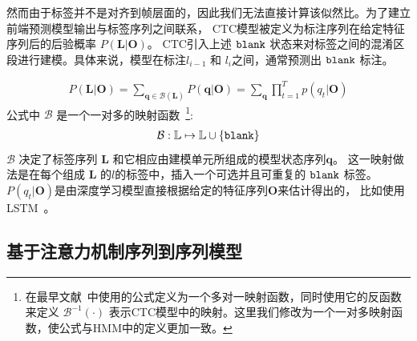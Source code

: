 然而由于标签并不是对齐到帧层面的，因此我们无法直接计算该似然比。为了建立前端预测模型输出与标签序列之间联系，
CTC模型被定义为标注序列在给定特征序列后的后验概率 $P(\mathbf{L}|\mathbf{O})$。
CTC引入上述 $\tt blank$ 状态来对标签之间的混淆区段进行建模。具体来说，模型在标注$l_{i-1}$ 和 $l_{i}$之间，通常预测出 $ \tt blank$ 标注。

\begin{equation}
\label{equ:ctc-model}
\begin{split}
P(\mathbf{L}|\mathbf{O})=\sum_{\mathbf{q}\in\mathcal{B}(\mathbf{L})}P(\mathbf{q}|\mathbf{O}) =\sum_{\mathbf{q}}\prod_{t=1}^{T} p(q_t|\mathbf{O})
\end{split}
\end{equation}
公式中 $\mathcal{B}$ 是一个一对多的映射函数~\footnote{在最早文献~\cite{graves2006connectionist}中使用的公式定义为一个多对一映射函数，同时使用它的反函数来定义 $\mathcal{B}^{-1}(\cdot)$ 表示CTC模型中的映射。这里我们修改为一个一对多映射函数，使公式与HMM中的定义更加一致。}:
\begin{equation}
\label{equ:ctc-b}
\begin{split}
\mathcal{B}:\mathbb{L}   \mapsto  \mathbb{L} \cup \{\tt blank\}
\end{split}
\end{equation}
$\mathcal{B}$ 决定了标签序列 $\mathbf{L}$ 和它相应由建模单元所组成的模型状态序列$\mathbf{q}$。 这一映射做法是在每个组成 $\mathbf{L}$ 的$l$的标签中，插入一个可选并且可重复的 $ \tt blank$ 标签。 $P(q_t|\mathbf{O})$是由深度学习模型直接根据给定的特征序列$\mathbf{O}$来估计得出的， 比如使用LSTM~\cite{hochreiter1997long}。 

\subsection{基于注意力机制序列到序列模型}
\label{chap:intro2-e2e-s2s}


